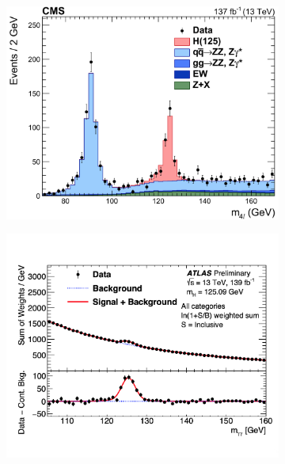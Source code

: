 \begin{figure}[ht]
        \centering
        \begin{subfigure}[b]{0.475\textwidth}
            \centering
            \includegraphics[width=\textwidth]{MSc_Thesis/fig/cms-higgs-13tev.png}
            \vspace{-0.5cm}
        \end{subfigure}
        \hspace{0.2cm}
        \begin{subfigure}[b]{0.475\textwidth}  
            \centering 
            \includegraphics[width=\textwidth]{MSc_Thesis/fig/atlas-higgs-13tev.png}

\end{subfigure}
\end{figure}
